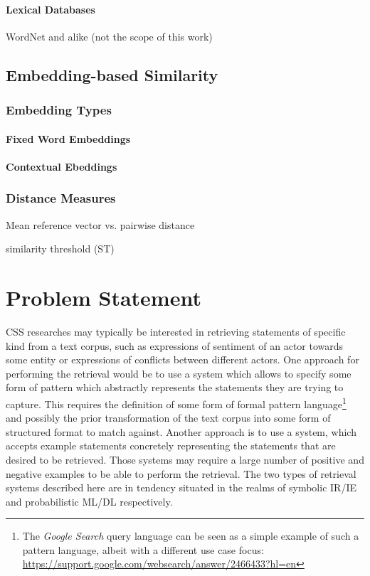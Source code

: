 \documentclass[11pt]{scrreprt}
\begin{document}
\subsubsection{Lexical Databases}
WordNet and alike (not the scope of this work)


\section{Embedding-based Similarity}

\subsection{Embedding Types}

\subsubsection{Fixed Word Embeddings}

\subsubsection{Contextual Ebeddings}


\subsection{Distance Measures}

Mean reference vector vs. pairwise distance

similarity threshold (ST)

\chapter{Problem Statement}
\label{cha:problem-statement}
CSS researches may typically be interested in retrieving statements of specific kind from a text corpus, such as expressions of sentiment of an actor towards some entity or expressions of conflicts between different actors. One approach for performing the retrieval would be to use a system which allows to specify some form of pattern which abstractly represents the statements they are trying to capture. This requires the definition of some form of formal pattern language\footnote{The \textit{Google Search} query language can be seen as a simple example of such a pattern language, albeit with a different use case focus: \url{https://support.google.com/websearch/answer/2466433?hl=en}} and possibly the prior transformation of the text corpus into some form of structured format to match against. Another approach is to use a system, which accepts example statements concretely representing the statements that are desired to be retrieved. Those systems may require a large number of positive and negative examples to be able to perform the retrieval. The two types of retrieval systems described here are in tendency situated in the realms of symbolic IR/IE and probabilistic ML/DL respectively.
\end{document}
